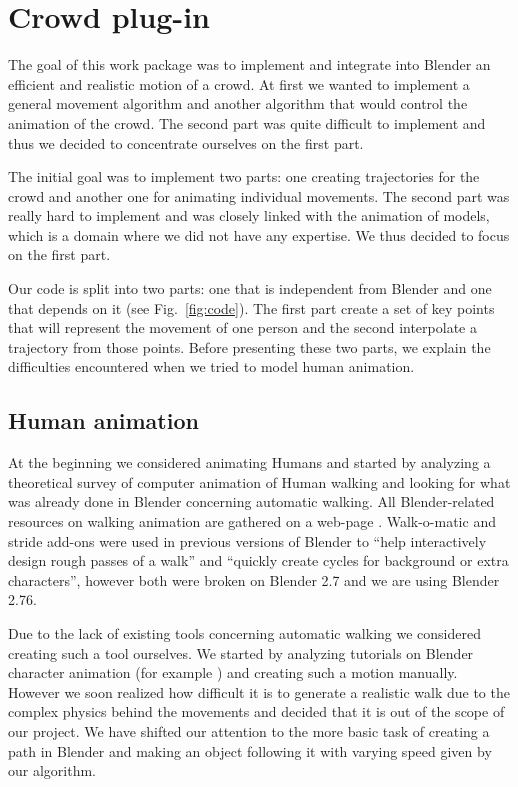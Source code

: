 \section{Crowd plug-in}

The goal of this work package was to implement and integrate into
Blender an efficient and realistic motion of a crowd. At first we
wanted to implement a general movement algorithm and another
algorithm that would control the animation of the crowd. The second
part was quite difficult to implement and thus we decided to
concentrate ourselves on the first part.


The initial goal was to implement two parts: one creating trajectories
for the crowd and another one for animating individual movements. The
second part was really hard to implement and was closely linked with
the animation of models, which is a domain where we did not have any
expertise. We thus decided to focus on the first part.


Our code is split into two parts: one that is independent from Blender
and one that depends on it (see Fig.~\ref{fig:code}). The first part
create a set of key points that will represent the movement of one
person and the second interpolate a trajectory from those
points. Before presenting these two parts, we explain the difficulties
encountered when we tried to model human animation.


\subsection{Human animation}

At the beginning we considered animating Humans and started by
analyzing a theoretical survey of computer animation of Human walking
\cite{th_walking} and looking for what was already done in Blender
concerning automatic walking. All Blender-related resources on walking
animation are gathered on a web-page
\cite{blwikiwalking}. Walk-o-matic and stride add-ons were used in
previous versions of Blender to ``help interactively design rough
passes of a walk'' and ``quickly create cycles for background or extra
characters'', however both were broken on Blender 2.7 and we are using
Blender 2.76.

Due to the lack of existing tools concerning automatic walking we
considered creating such a tool ourselves. We started by analyzing
tutorials on Blender character animation (for example
\cite{tuto_walk}) and creating such a motion manually. However we soon
realized how difficult it is to generate a realistic walk due to the
complex physics behind the movements and decided that it is out of the
scope of our project. We have shifted our attention to the more basic
task of creating a path in Blender and making an object following it
with varying speed given by our algorithm.


